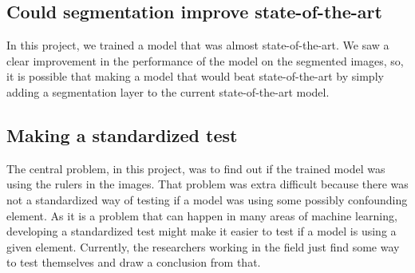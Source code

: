 \subsection{Could segmentation improve state-of-the-art}
In this project, we trained a model that was almost state-of-the-art.
We saw a clear improvement in the performance of the model on the segmented images,
so, it is possible that making a model that would beat state-of-the-art by simply adding a 
segmentation layer to the current state-of-the-art model.

\subsection{Making a standardized test}
The central problem, in this project, was to find out if the trained model was using the rulers in the images.
That problem was extra difficult because there was not a standardized way of testing if a model was using some possibly confounding element.
As it is a problem that can happen in many areas of machine learning,
developing a standardized test might make it easier to test if a model is using a given element.
Currently, the researchers working in the field just find some way to test themselves and draw a conclusion from that.

